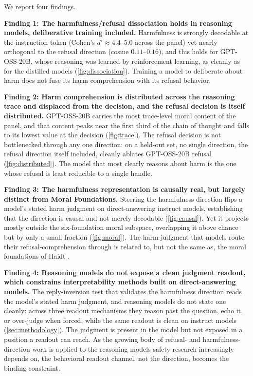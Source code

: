 We report four findings.

\textbf{Finding 1: The harmfulness/refusal dissociation holds in reasoning models,
deliberative training included.} Harmfulness is strongly decodable at the
instruction token (Cohen's \(d' \approx 4.4\)--\(5.0\) across the panel) yet nearly
orthogonal to the refusal direction (cosine \(0.11\)--\(0.16\)), and this holds for
GPT-OSS-20B, whose reasoning was learned by reinforcement learning, as cleanly as
for the distilled models (\autoref{fig:dissociation}). Training a model to
deliberate about harm does not fuse its harm comprehension with its refusal
behavior.

\textbf{Finding 2: Harm comprehension is distributed across the reasoning trace and
displaced from the decision, and the refusal decision is itself distributed.}
GPT-OSS-20B carries the most trace-level moral content of the panel, and that
content peaks near the first third of the chain of thought and falls to its lowest
value at the decision (\autoref{fig:trace}). The refusal decision is not
bottlenecked through any one direction: on a held-out set, no single direction, the
refusal direction itself included, cleanly ablates GPT-OSS-20B refusal
(\autoref{fig:distributed}). The model that most clearly reasons about harm is the
one whose refusal is least reducible to a single handle.

\textbf{Finding 3: The harmfulness representation is causally real, but largely distinct
from Moral Foundations.} Steering the harmfulness direction flips a model's stated
harm judgment on direct-answering instruct models, establishing that the direction
is causal and not merely decodable (\autoref{fig:causal}). Yet it projects mostly
outside the six-foundation moral subspace, overlapping it above chance but by only a
small fraction (\autoref{fig:moral}). The harm-judgment that models route their
refusal-comprehension through is related to, but not the same as, the moral
foundations of Haidt \citep{graham2013mft}.

\textbf{Finding 4: Reasoning models do not expose a clean judgment readout, which
constrains interpretability methods built on direct-answering models.} The
reply-inversion test that validates the harmfulness direction reads the model's
stated harm judgment, and reasoning models do not state one cleanly: across three
readout mechanisms they reason past the question, echo it, or over-judge when
forced, while the same readout is clean on instruct models
(\autoref{sec:methodology}). The judgment is present in the model but not exposed in
a position a readout can reach. As the growing body of refusal- and
harmfulness-direction work \citep{arditi2024refusal, zhao2025harmfulness} is applied
to the reasoning models safety research increasingly depends on, the behavioral
readout channel, not the direction, becomes the binding constraint.


